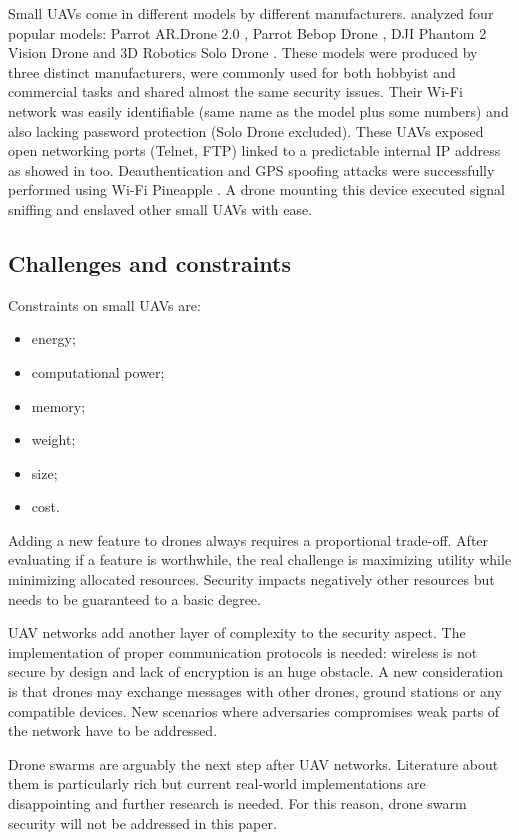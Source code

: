 \documentclass[journal]{IEEEtran}
\begin{document}
Small UAVs come in different models by different manufacturers. \cite{smartcitiesdronesecurity} analyzed four popular models: Parrot AR.Drone 2.0 \cite{ardrone}, Parrot Bebop Drone \cite{bebop}, DJI Phantom 2 Vision Drone \cite{phantomvision} and 3D Robotics Solo Drone \cite{solodrone}. These models were produced by three distinct manufacturers, were commonly used for both hobbyist and commercial tasks and shared almost the same security issues. Their Wi-Fi network was easily identifiable (same name as the model plus some numbers) and also lacking password protection (Solo Drone excluded). These UAVs exposed open networking ports (Telnet, FTP) linked to a predictable internal IP address as showed in \cite{dosardrone} too. Deauthentication and GPS spoofing attacks were successfully performed using Wi-Fi Pineapple \cite{wifipineapple}. A drone mounting this device executed signal sniffing and enslaved other small UAVs with ease.

\subsection{Challenges and constraints}

Constraints on small UAVs are:
\begin{itemize}
\item energy;
\item computational power;
\item memory;
\item weight;
\item size;
\item cost.
\end{itemize}
Adding a new feature to drones always requires a proportional trade-off. After evaluating if a feature is worthwhile, the real challenge is maximizing utility while minimizing allocated resources. Security impacts negatively other resources but needs to be guaranteed to a basic degree.

UAV networks add another layer of complexity to the security aspect. The implementation of proper communication protocols is needed: wireless is not secure by design and lack of encryption is an huge obstacle. A new consideration is that drones may exchange messages with other drones, ground stations or any compatible devices. New scenarios where adversaries compromises weak parts of the network have to be addressed.

Drone swarms are arguably the next step after UAV networks. Literature  about them is particularly rich but current real-world implementations are disappointing and further research is needed. For this reason, drone swarm security will not be addressed in this paper.
\end{document}
